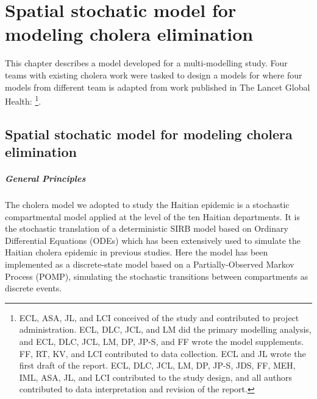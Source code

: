 \chapter{Spatial stochatic model for modeling cholera elimination}
\label{ch:cholera-haiti-ocv}

This chapter describes a model developed for a multi-modelling study. Four teams with existing cholera work were tasked to design a models for  where four models from different team  is adapted from work published in The Lancet Global Health:
\footnote{ECL, ASA, JL, and LCI conceived of the study and contributed to project administration. ECL, DLC, JCL, and LM did the primary modelling analysis, and ECL, DLC, JCL, LM, DP, JP-S, and FF wrote the model supplements. FF, RT, KV, and LCI contributed to data collection. ECL and JL wrote the first draft of the report. ECL, DLC, JCL, LM, DP, JP-S, JDS, FF, MEH, IML, ASA, JL, and LCI contributed to the study design, and all authors contributed to data interpretation and revision of the report.}. 



\section{Spatial stochatic model for modeling cholera elimination}
\paragraph{General Principles} The cholera model we adopted to study the Haitian epidemic is a stochastic compartmental model applied at the level of the ten Haitian departments. 
It is the stochastic translation of a deterministic SIRB model based on Ordinary Differential Equations (ODEs) which has been extensively used to simulate the Haitian cholera epidemic in previous studies\cite{Rinaldo:Reassessment20102011:2012, Bertuzzo:PredictionSpatialEvolution:2011,Bertuzzo:ProbabilityExtinctionHaiti:2016,Pasetto:RealtimeForecastingCholera:2018, Lemaitre:RainfallDriverEpidemic:2019}. 
Here the model has been implemented as a discrete-state model based on a Partially-Observed Markov Process (POMP), simulating the stochastic transitions between compartments as discrete events\cite{King:InapparentInfectionsCholera:2008}.

